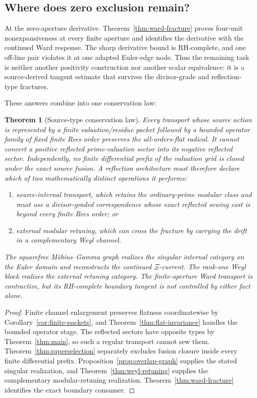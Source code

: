 \documentclass[11pt]{article}
\newtheorem{theorem}{Theorem}[section]
\theoremstyle{definition}
\theoremstyle{remark}
\begin{document}
\subsection{Where does zero exclusion remain?}

At the zero-aperture derivative.  Theorem~\ref{thm:ward-fracture} proves four-unit
nonexpansiveness at every finite aperture and identifies the derivative with the continued Ward
response.  The sharp derivative bound is RH-complete, and one off-line pair violates it at one
adapted Euler-edge node.  Thus the remaining task is neither another positivity construction nor
another scalar equivalence: it is a source-derived tangent estimate that survives the
divisor-grade and reflection-type fractures.

These answers combine into one conservation law:

\begin{theorem}[Source-type conservation law]\label{thm:conservation}
Every transport whose source action is represented by a finite valuation/residue packet followed
by a bounded operator family of fixed finite Rees order preserves the all-orders-flat radical.
It cannot convert a positive reflected prime-valuation sector into its negative reflected
sector.  Independently, no finite differential prefix of the valuation grid is closed under
the exact source fusion.  A reflection architecture must therefore declare which of two
mathematically distinct operations it performs:
\begin{enumerate}[label=\textup{(\roman*)}]
\item \emph{source-internal transport}, which retains the ordinary-prime modular class and must
use a divisor-graded correspondence whose exact reflected sewing cost is beyond every finite
Rees order; or
\item \emph{external modular retuning}, which can cross the fracture by carrying the drift in a
complementary Weyl channel.
\end{enumerate}
The squarefree M\"obius--Gamma graph realizes the singular internal category on the Euler domain
and reconstructs the continued \(\Xi\)-current.  The rank-one Weyl block realizes the external
retuning category.  The finite-aperture Ward transport is contractive, but its RH-complete
boundary tangent is not controlled by either fact alone.
\end{theorem}

\begin{proof}
Finite channel enlargement preserves flatness coordinatewise by
Corollary~\ref{cor:finite-packets}, and
Theorem~\ref{thm:flat-invariance} handles the bounded operator stage.  The reflected sectors have
opposite types by Theorem~\ref{thm:main}, so such a regular transport cannot sew them.
Theorem~\ref{thm:superselection} separately excludes fusion closure inside every finite
differential prefix.  Proposition~\ref{prop:overlap-graph} supplies the stated singular
realization, and Theorem~\ref{thm:weyl-retuning} supplies the complementary modular-retuning
realization.  Theorem~\ref{thm:ward-fracture} identifies the exact boundary consumer.
\end{proof}
\end{document}
